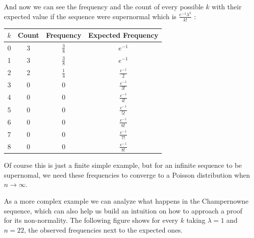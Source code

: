 \documentclass[11pt,a4paper]{tesis}
\theoremstyle{definition}
\begin{document}
And now we can see the frequency and the count of every possible $k$ with their expected value if the sequence were supernormal which is $\frac{e^{-\lambda}\lambda^k}{k!}$ :

\begin{center}
    \begin{tabular}{|c | c |  c| c |} 
    \hline
    $k$ & Count &  Frequency & Expected Frequency \\ [0.1ex] 
    \hline
    0 & 3 & $\frac{3}{8}$ & $e^{-1} $ \\ [0.5ex] 
    \hline
    1 & 3 &$\frac{3}{8}$ & $e^{-1} $ \\  [0.5ex] 
    \hline
    2 & 2 &$\frac{1}{4}$ & $\frac{e^{-1}}{2} $ \\  [0.5ex] 
    \hline
    3 & 0 & 0 & $\frac{e^{-1}}{3!} $ \\  [0.5ex] 
    \hline
    4 & 0 & 0 & $\frac{e^{-1}}{4!} $ \\ [0.5ex] 
    \hline
    5 & 0 & 0 & $\frac{e^{-1}}{5!} $ \\ [0.5ex] 
    \hline
    6 & 0 & 0  & $\frac{e^{-1}}{6!} $ \\ [0.5ex] 
    \hline
    7 & 0 & 0 & $\frac{e^{-1}}{7!} $ \\ [0.5ex] 
    \hline
    8 & 0 & 0 & $\frac{e^{-1}}{8!} $ \\  [0.5ex] 
    \hline
   \end{tabular}
\end{center}

Of course this is just a finite simple example, but for an infinite sequence to be supernomal, we need these frequencies to converge to a Poisson distribution when $n \rightarrow \infty$. 

As a more complex example we can analyze what happens in the Champernowne sequence, which can also help us build an intuition on how to approach a proof for its non-normality.
The following figure shows for every $k$ taking $\lambda = 1$ and $n = 22$, the observed frequencies next to the expected ones.

\end{document}
